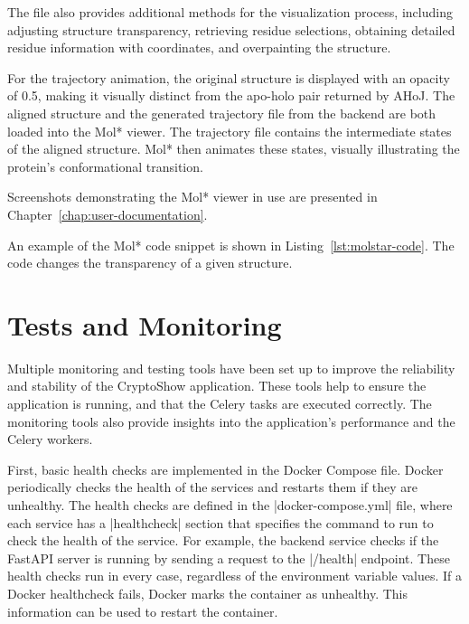 The file also provides additional methods for the visualization process, including adjusting structure transparency, retrieving residue selections, obtaining detailed residue information with coordinates, and overpainting the structure.

For the trajectory animation, the original structure is displayed with an opacity of 0.5, making it visually distinct from the apo-holo pair returned by AHoJ. The aligned structure and the generated trajectory file from the backend are both loaded into the Mol* viewer. The trajectory file contains the intermediate states of the aligned structure. Mol* then animates these states, visually illustrating the protein's conformational transition.

Screenshots demonstrating the Mol* viewer in use are presented in Chapter~\ref{chap:user-documentation}.

An example of the Mol* code snippet is shown in Listing~\ref{lst:molstar-code}. The code changes the transparency of a given structure.



\section{Tests and Monitoring}
\label{sec:tests-monitoring}

Multiple monitoring and testing tools have been set up to improve the reliability and stability of the CryptoShow application. These tools help to ensure the application is running, and that the Celery tasks are executed correctly. The monitoring tools also provide insights into the application's performance and the Celery workers.

First, basic health checks are implemented in the Docker Compose file. Docker periodically checks the health of the services and restarts them if they are unhealthy. The health checks are defined in the \inline|docker-compose.yml| file, where each service has a \inline|healthcheck| section that specifies the command to run to check the health of the service. For example, the backend service checks if the FastAPI server is running by sending a request to the \inline|/health| endpoint. These health checks run in every case, regardless of the environment variable values. If a Docker healthcheck fails, Docker marks the container as unhealthy. This information can be used to restart the container.

